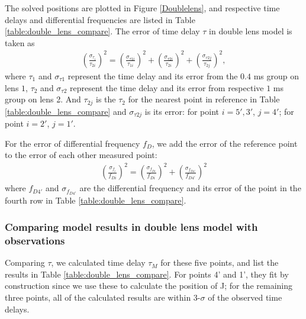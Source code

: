 \documentclass[useAMS,usenatbib]{mn2e}
\begin{document}
The solved positions are plotted in Figure \ref{Doublelens}, and
respective time delays and differential frequencies are listed in
Table \ref{table:double_lens_compare}. The error of time delay $\tau$
in double lens model is taken as
\begin{equation}
\begin{aligned}
(\frac{\sigma_{\tau_i}}{\tau_{2i}})^2 = (\frac{\sigma_{\tau1i}}{\tau_{1i}})^2+(\frac{\sigma_{\tau2i}}{\tau_{2i}})^2 + (\frac{\sigma_{\tau2j}}{\tau_{2j}})^2,
\end{aligned}
\end{equation}
where $\tau_1$ and $\sigma_{\tau1}$ represent the time delay and its
error from the $0.4$ ms group on lens $1$, $\tau_2$ and
$\sigma_{\tau2}$ represent the time delay and its error from
respective $1$ ms group on lens 2. And $\tau_{2j}$ is the $\tau_2$ for
the nearest point in reference in Table
\ref{table:double_lens_compare} and $\sigma_{\tau2j}$ is its error:
for point $i=5',3'$, $j=4'$; for point $i=2'$, $j=1'$.

For the error of differential frequency $f_D$, we add the error of the
reference point to the error of each other measured point:
\begin{equation}
\begin{aligned}
(\frac{\sigma_{f_i}}{f_{Di}})^2=(\frac{\sigma_{f_{Di}}}{f_{Di}})^2+(\frac{\sigma_{f_{D4'}}}{f_{D4'}})^2
\end{aligned}
\end{equation}
where $f_{D4'}$ and $\sigma_{f_{D4'}}$ are the differential frequency
and its error of the point in the fourth row in Table
\ref{table:double_lens_compare}.

\subsubsection{Comparing model results in double lens model with observations}
Comparing $\tau$, we calculated time delay $\tau_M$ for these five
points, and list the results in Table
\ref{table:double_lens_compare}. For points 4' and 1', they fit by
construction since we use these to calculate the position of J; for the remaining three points, all of the calculated results are within 3-$\sigma$ of the observed time delays.
\end{document}

